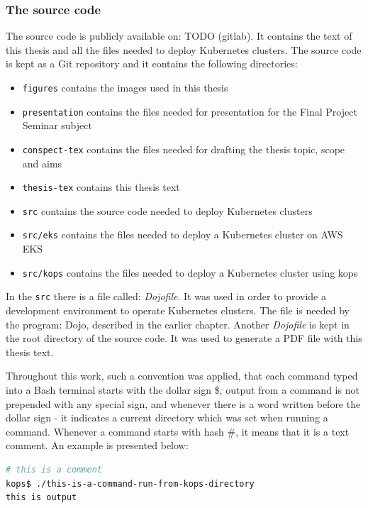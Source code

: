 \subsubsection{The source code}
The source code is publicly available on: TODO (gitlab). It contains the text of this thesis and all the files needed to deploy Kubernetes clusters. The source code is kept as a Git repository and it contains the following directories:
\begin{itemize}
\item \verb|figures| contains the images used in this thesis
\item \verb|presentation| contains the files needed for presentation for the Final Project Seminar subject
\item \verb|conspect-tex| contains the files needed for drafting the thesis topic, scope and aims
\item \verb|thesis-tex| contains this thesis text
\item \verb|src| contains the source code needed to deploy Kubernetes clusters
\item \verb|src/eks| contains the files needed to deploy a Kubernetes cluster on AWS EKS
\item \verb|src/kops| contains the files needed to deploy a Kubernetes cluster using kops
\end{itemize}

In the \verb|src| there is a file called: \textit{Dojofile}. It was used in order to provide a development environment to operate Kubernetes clusters. The file is needed by the program: Dojo, described in the earlier chapter. Another \textit{Dojofile} is kept in the root directory of the source code. It was used to generate a PDF file with this thesis text.

Throughout this work, such a convention was applied, that each command typed into a Bash terminal starts with the dollar sign \$, output from a command is not prepended with any special sign, and whenever there is a word written before the dollar sign - it indicates a current directory which was set when running a command. Whenever a command starts with hash \#, it means that it is a text comment. An example is presented below:
\begin{lstlisting}[basicstyle=\tiny,caption={An example code listing explaining the format},captionpos=b,language=Bash,xleftmargin=1cm]
# this is a comment
kops$ ./this-is-a-command-run-from-kops-directory
this is output
\end{lstlisting}

